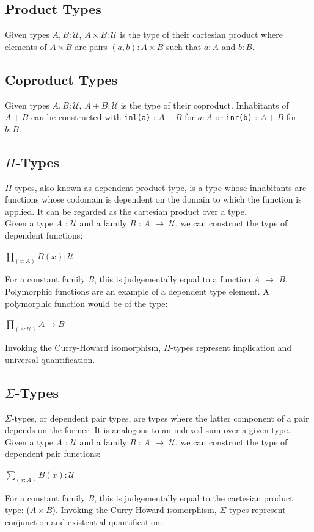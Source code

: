 \documentclass[12pt]{report}
\begin{document}
\subsection{Product Types}
Given types $A,B : \mathcal{U}$, $A \times B : \mathcal{U}$ is the type of their cartesian product where elements of $A \times B$ are pairs $(a,b) : A \times B$ such that $a : A$ and $b : B$. 

\subsection{Coproduct Types}
Given types $A,B : \mathcal{U}$, $A + B : \mathcal{U}$ is the type of their coproduct. Inhabitants of $A + B$ can be constructed with \texttt{inl(a)} : $A + B$ for $a : A$ or \texttt{inr(b)} : $A + B$ for $b : B$.


\subsection{$\Pi$-Types}
$\Pi$-types, also known as dependent product type, is a type whose inhabitants are functions whose codomain is dependent on the domain to which the function is applied. It can be regarded as the cartesian product over a type.\\
Given a type \textit{A} : $\mathcal{U}$ and a family \textit{B} : \textit{A} $\rightarrow$ $\mathcal{U}$, we can construct the type of dependent functions:
\begin{center}
$ \prod_{(x:A)}^{} B(x) : \mathcal{U} $
\end{center}
For a constant family \textit{B}, this is judgementally equal to a function \textit{A} $\rightarrow$ \textit{B}.\\
Polymorphic functions are an example of a dependent type element. A polymorphic function would be of the type:
\begin{center}
$ \prod_{(A:\mathcal{U})}^{} A \rightarrow B $
\end{center}
Invoking the Curry-Howard isomorphism, $\Pi$-types represent implication and universal quantification.


\subsection{$\Sigma$-Types}
$\Sigma$-types, or dependent pair types, are types where the latter component of a pair depends on the former. It is analogous to an indexed sum over a given type. 
Given a type \textit{A} : $\mathcal{U}$ and a family \textit{B} : \textit{A} $\rightarrow$ $\mathcal{U}$, we can construct the type of dependent pair functions:
\begin{center}
$ \sum_{(x:A)}^{} B(x) : \mathcal{U} $
\end{center}
For a constant family \textit{B}, this is judgementally equal to the cartesian product type: ($A \times B$).
Invoking the Curry-Howard isomorphism, $\Sigma$-types represent conjunction and existential quantification.
\end{document}
